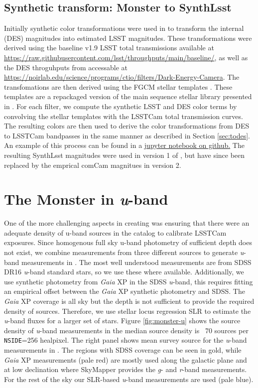 \subsection{Synthetic transform: Monster to  SynthLsst}
Initially synthetic color transformations were used in \monster to transform the internal (DES) magnitudes into estimated LSST magnitudes. 
These transformations were derived using the baseline v1.9 LSST total transmissions available at \url{https://raw.githubusercontent.com/lsst/throughputs/main/baseline/}, as well as the DES throguhputs from \citet{Abbott:2021} accessable at \url{https://noirlab.edu/science/programs/ctio/filters/Dark-Energy-Camera}.
The transfomations are then derived using the FGCM stellar templates \citep{Burke:2018}. 
These templates are a repackaged version of the main sequence stellar library presented in \citet{Kelly:2012}.
For each filter, we compute the synthetic LSST and DES color terms by convolving the stellar templates with the LSSTCam total transmission curves.
The resulting colors are then used to derive the color transformations from DES to LSSTCam bandpasses in the same manner as described in Section \ref{sec:todes}.
An example of this process can be found in a \href{https://github.com/lsst-dm/the_monster/blob/main/notebooks/fgcm_star_templates.ipynb}{jupyter notebook on github.}
The resulting SynthLsst magnitudes were used in version 1 of \monster, but have since been replaced by the emprical comCam magnitues in version 2.

\section{The Monster in \textit{u}-band}

One of the more challenging aspects in creating \monster was ensuring that there were an adequate density of u-band sources in the catalog to calibrate LSSTCam exposures. 
Since homogenous full sky u-band photometry of sufficient depth does not exist, we combine measurements from three different sources to generate \textit{u}-band measurements in \monster. 
The most well understood measurements are from SDSS DR16 \textit{u}-band standard stars, so we use these where available. 
Additionally, we use synthetic photometry from \emph{Gaia} XP in the SDSS \textit{u}-band, this requires fitting an empirical offset between the \emph{Gaia} XP synthetic photometry and SDSS.
The  \emph{Gaia} XP coverage is all sky but the depth is not sufficient to provide the required density of sources.
Therefore, we use stellar locus regression SLR to estimate the \textit{u}-band fluxes for a larger set of stars.
Figure \ref{fig:monster-u} shows the source density of \textit{u}-band measurements in \monster the median source density is ~70 sources per \texttt{NSIDE}=256 healpixel. 
The right panel shows mean survey source for the \textit{u}-band measurements in \monster. 
The regions with SDSS coverage can be seen in gold, while \textit{Gaia} XP measurements (pale red) are mostly used along the galactic plane and at low declination where SkyMapper provides the \emph{g}- and \emph{r}-band measurements. 
For the rest of the sky our SLR-based \textit{u}-band measurements are used (pale blue).

